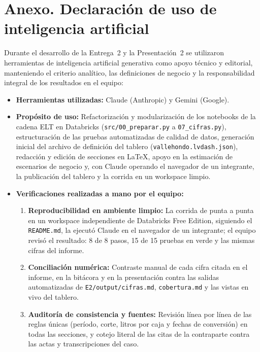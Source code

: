 
\section*{Anexo. Declaración de uso de inteligencia artificial}
\label{anexo:ia}

Durante el desarrollo de la Entrega~2 y la Presentación~2 se utilizaron herramientas de inteligencia artificial generativa como apoyo técnico y editorial, manteniendo el criterio analítico, las definiciones de negocio y la responsabilidad integral de los resultados en el equipo:

{\sloppy
\begin{itemize}
  \item \textbf{Herramientas utilizadas:} Claude (Anthropic) y Gemini (Google).
  \item \textbf{Propósito de uso:} Refactorización y modularización de los notebooks de la cadena ELT en Databricks (\texttt{src/00\_preparar.py} a \texttt{07\_cifras.py}), estructuración de las pruebas automatizadas de calidad de datos, generación inicial del archivo de definición del tablero (\texttt{vallehondo.lvdash.json}), redacción y edición de secciones en \LaTeX{}, apoyo en la estimación de escenarios de negocio y, con Claude operando el navegador de un integrante, la publicación del tablero y la corrida en un workspace limpio.
  \item \textbf{Verificaciones realizadas a mano por el equipo:}
  \begin{enumerate}
    \item \textbf{Reproducibilidad en ambiente limpio:} La corrida de punta a punta en un workspace independiente de Databricks Free Edition, siguiendo el \texttt{README.md}, la ejecutó Claude en el navegador de un integrante; el equipo revisó el resultado: 8 de 8 pasos, 15 de 15 pruebas en verde y las mismas cifras del informe.
    \item \textbf{Conciliación numérica:} Contraste manual de cada cifra citada en el informe, en la bitácora y en la presentación contra las salidas automatizadas de \texttt{E2/output/cifras.md}, \texttt{cobertura.md} y las vistas en vivo del tablero.
    \item \textbf{Auditoría de consistencia y fuentes:} Revisión línea por línea de las reglas únicas (período, corte, litros por caja y fechas de conversión) en todas las secciones, y cotejo literal de las citas de la contraparte contra las actas y transcripciones del caso.
  \end{enumerate}
\end{itemize}
}
